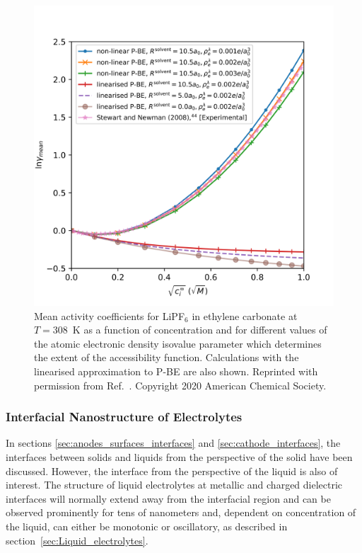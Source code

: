 \documentclass[../main.tex]{subfiles}
\begin{document}
\begin{figure}
    \includegraphics[scale=0.8]{figures/lipf6.png}
    \caption{Mean activity coefficients for LiPF$_6$ in ethylene carbonate at $T=308$~K as a function of concentration and for different values of the atomic electronic density isovalue parameter which determines the extent of the accessibility function. Calculations with the linearised approximation to P-BE are also shown. Reprinted with permission from Ref.~. Copyright 2020 American Chemical Society.}
    \label{fig:ac}
\end{figure}

\subsubsection{Interfacial Nanostructure of Electrolytes}
In sections \ref{sec:anodes_surfaces_interfaces} and \ref{sec:cathode_interfaces}, the interfaces between solids and liquids from the perspective of the solid have been discussed. However, the interface from the perspective of the liquid is also of interest. The structure of liquid electrolytes at metallic\cite{merlet_simulating_2013} and charged dielectric\cite{smith_electrostatic_2016} interfaces will normally extend away from the interfacial region and can be observed prominently for tens of nanometers and, dependent on concentration of the liquid, can either be monotonic or oscillatory, as described in section~\ref{sec:Liquid_electrolytes}. \cite{CHOWDHURY2021230173,zhang2021characterizing,perkin2006forces}
\end{document}
